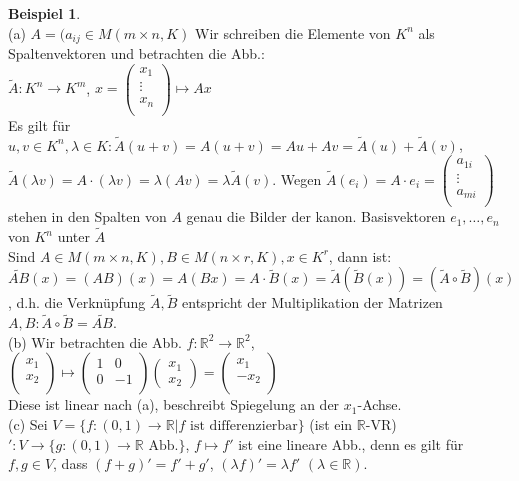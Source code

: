 \documentclass[10pt,a4paper,numbers=endperiod]{scrartcl}
\theoremstyle{definition}
\newtheorem{bsp}[satz]{Beispiel}
\def\RR{{\mathbb R}}
\begin{document}
\begin{bsp}
	$ $\\
	(a) $A=(a_{ij} \in M(m \times n, K)$ Wir schreiben die Elemente von $K^n$ als Spaltenvektoren und betrachten die Abb.: \\
	$\tilde{A}:K^n \rightarrow K^m$, $x=\begin{pmatrix}
	x_1\\
	\vdots\\
	x_n\\
	\end{pmatrix}
	\mapsto Ax$\\
	Es gilt für $u,v \in K^n, \lambda \in K: \tilde{A}(u+v) = A(u+v) = Au+Av= \tilde{A}(u)+\tilde{A}(v)$, $\tilde{A}(\lambda v)= A \cdot(\lambda v) = \lambda(Av) = \lambda \tilde{A}(v)$.
	Wegen $\tilde{A}(e_i)= A\cdot e_i = \begin{pmatrix}
	a_{1i}\\\vdots\\a_{mi}\\
	\end{pmatrix}$ stehen in den Spalten von $A$ genau die Bilder der kanon. Basisvektoren $e_1,\ldots,e_n$ von $K^n$ unter $\tilde{A}$\\
	Sind $A \in M(m \times n, K), B \in M( n \times r,K), x\in K^r$, dann ist:\\
	$\widetilde{AB}(x) = (AB)(x)=A(Bx)=A \cdot \tilde{B}(x)= \tilde{A}(\tilde{B}(x))=(\tilde{A} \circ \tilde{B})(x)$, d.h. die Verknüpfung $\tilde{A},\tilde{B}$ entspricht  der Multiplikation der Matrizen $A,B:\tilde{A}\circ\tilde{B}=\widetilde{AB}$.\\
	(b) Wir betrachten die Abb. $f: \RR^2 \rightarrow \RR^2$, $\begin{pmatrix}
	x_1\\x_2\\
	\end{pmatrix} \mapsto \begin{pmatrix}
	1&0\\0&-1\\
	\end{pmatrix} \begin{pmatrix}
	x_1\\x_2
	\end{pmatrix}= \begin{pmatrix}
	x_1\\ -x_2\\
	\end{pmatrix}$\\
	Diese ist linear nach (a), beschreibt Spiegelung an der $x_1$-Achse.\\
	(c) Sei $V = \{f:(0,1) \rightarrow \RR| f \text{ ist differenzierbar}\}$ (ist ein $\RR$-VR)\\ $':V \rightarrow \{g:(0,1) \rightarrow \RR \text{ Abb.}\}$, $f \mapsto f'$ ist eine lineare Abb., denn es gilt für $f,g \in V$, dass $(f+g)'=f'+g'$, $(\lambda f)' = \lambda f'$ $(\lambda \in \RR)$.
\end{bsp}
\end{document}
